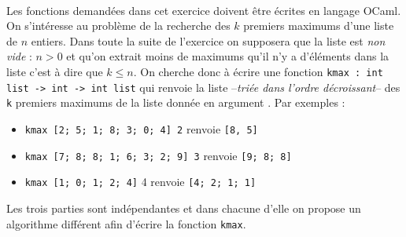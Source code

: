 \documentclass[11pt,a4paper]{article}
\begin{document}
\begin{Exercise}[title = {Recherche des $k$ premiers maximums d'une liste}] \\
	Les fonctions demandées dans cet exercice doivent être écrites en langage OCaml.\smallskip \\
	On s'intéresse au problème de la recherche des $k$ premiers maximums d'une liste de $n$ entiers. Dans toute la suite de l'exercice on supposera que la liste est \textit{non vide} : $n>0$ et qu'on extrait moins de maximums qu'il n'y a d'éléments dans la liste c'est à dire que $k \leqslant n$. On cherche donc à écrire une fonction {\tt kmax : int list -> int -> int list}  qui renvoie la liste --\textit{triée dans l'ordre décroissant}-- des {\tt k} premiers maximums de la liste donnée en argument . Par exemples :
	\begin{itemize}
		\item {\tt kmax [2; 5; 1; 8; 3; 0; 4] 2} renvoie {\tt [8, 5]}
		\item {\tt kmax [7; 8; 8; 1; 6; 3; 2; 9] 3} renvoie {\tt [9; 8; 8]}
		\item {\tt kmax [1; 0; 1; 2; 4]} 4 renvoie {\tt [4; 2; 1; 1]}
	\end{itemize}
	Les trois parties sont indépendantes et dans chacune d'elle on propose un algorithme différent afin d'écrire la fonction {\tt kmax}. \medskip


\end{Exercise}
\end{document}
